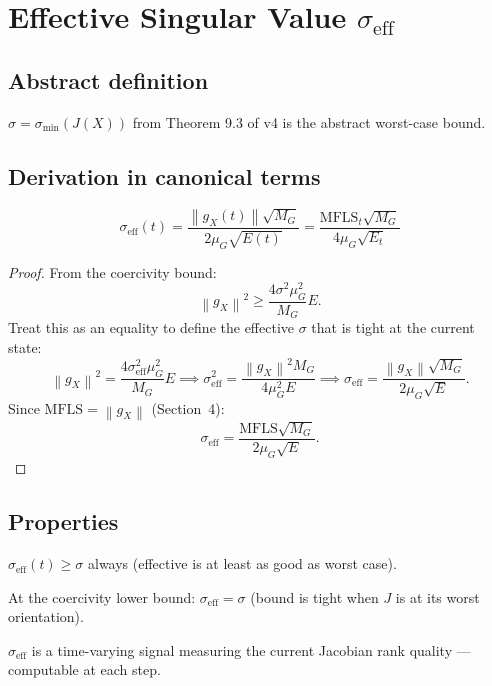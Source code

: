 \documentclass[11pt,a4paper]{article}
\theoremstyle{definition}
\newcommand{\norm}[1]{\left\|#1\right\|}
\newcommand{\gX}{g_X}
\newcommand{\mfls}{\mathrm{MFLS}}
\begin{document}
\section{Effective Singular Value $\sigma_\mathrm{eff}$}

\subsection{Abstract definition}

$\sigma = \sigma_{\min}(J(X))$ from Theorem 9.3 of v4 is the abstract worst-case bound.

\subsection{Derivation in canonical terms}

\begin{lockedbox}
\[
\sigma_\mathrm{eff}(t) = \frac{\norm{\gX(t)}\sqrt{M_G}}{2\mu_G\sqrt{E(t)}} = \frac{\mfls_t\sqrt{M_G}}{4\mu_G\sqrt{E_t}}
\]
\end{lockedbox}

\begin{proof}
From the coercivity bound:
\[
\norm{\gX}^2 \geq \frac{4\sigma^2\mu_G^2}{M_G}E.
\]
Treat this as an equality to define the effective $\sigma$ that is tight at the current state:
\[
\norm{\gX}^2 = \frac{4\sigma_\mathrm{eff}^2\mu_G^2}{M_G}E
\implies
\sigma_\mathrm{eff}^2 = \frac{\norm{\gX}^2 M_G}{4\mu_G^2 E}
\implies
\sigma_\mathrm{eff} = \frac{\norm{\gX}\sqrt{M_G}}{2\mu_G\sqrt{E}}.
\]
Since $\mfls = \norm{\gX}$ (Section~4):
\[
\sigma_\mathrm{eff} = \frac{\mfls\sqrt{M_G}}{2\mu_G\sqrt{E}}.
\]
\end{proof}

\subsection{Properties}

$\sigma_\mathrm{eff}(t) \geq \sigma$ always (effective is at least as good as worst case).

At the coercivity lower bound: $\sigma_\mathrm{eff} = \sigma$ (bound is tight when $J$ is at its worst orientation).

$\sigma_\mathrm{eff}$ is a time-varying signal measuring the current Jacobian rank quality — computable at each step.

\end{document}
